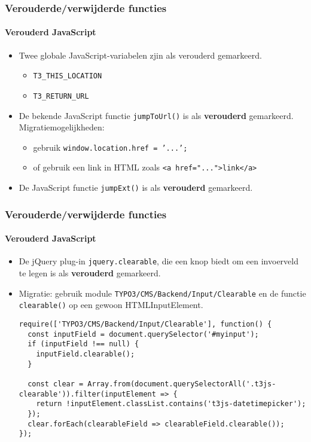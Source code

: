 \begin{frame}[fragile]
	\frametitle{Verouderde/verwijderde functies}
	\framesubtitle{Verouderd JavaScript}

	\begin{itemize}
		\item Twee globale JavaScript-variabelen zjin als verouderd gemarkeerd.

			\begin{itemize}
				\item \texttt{T3\_THIS\_LOCATION}
				\item \texttt{T3\_RETURN\_URL}
			\end{itemize}

		\item De bekende JavaScript functie \texttt{jumpToUrl()} is als \textbf{verouderd} gemarkeerd.
			Migratiemogelijkheden:

			\begin{itemize}
				\item gebruik \texttt{window.location.href = '...';}
				\item of gebruik een link in HTML zoals \texttt{<a href="...">link</a>}
			\end{itemize}

		\item De JavaScript functie \texttt{jumpExt()} is als \textbf{verouderd} gemarkeerd.

	\end{itemize}

\end{frame}


\begin{frame}[fragile]
	\frametitle{Verouderde/verwijderde functies}
	\framesubtitle{Verouderd JavaScript}

	\lstset{basicstyle=\tiny\ttfamily}

	\begin{itemize}
		\item De jQuery plug-in \texttt{jquery.clearable},
			die een knop biedt om een invoerveld te legen is als \textbf{verouderd} gemarkeerd.
		\item Migratie: gebruik module \small\texttt{TYPO3/CMS/Backend/Input/Clearable}\normalsize
			en de functie \texttt{clearable()} op een gewoon HTMLInputElement.
\begin{lstlisting}
require(['TYPO3/CMS/Backend/Input/Clearable'], function() {
  const inputField = document.querySelector('#myinput');
  if (inputField !== null) {
    inputField.clearable();
  }

  const clear = Array.from(document.querySelectorAll('.t3js-clearable')).filter(inputElement => {
    return !inputElement.classList.contains('t3js-datetimepicker');
  });
  clear.forEach(clearableField => clearableField.clearable());
});
\end{lstlisting}

	\end{itemize}

\end{frame}

